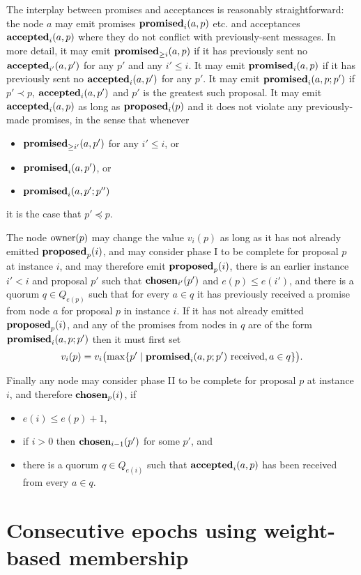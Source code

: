 \documentclass[journal]{IEEEtran}
\begin{document}
The interplay between promises and acceptances is reasonably straightforward:
the node $a$ may emit promises $\mathbf{promised}_{i}(a,p)$ etc. and acceptances
$\mathbf{accepted}_{i}(a,p)$ where they do not conflict with previously-sent messages. In
more detail, it may emit $\mathbf{promised}_{\ge i}(a,p)$ if it has previously sent no
$\mathbf{accepted}_{i'}(a,p')$ for any $p'$ and any $i' \le i$.  It may emit
$\mathbf{promised}_{i}(a,p)$ if it has previously sent no $\mathbf{accepted}_{i}(a,p')$ for any $p'$.
It may emit $\mathbf{promised}_{i}(a,p;p')$ if $p' \prec p$, $\mathbf{accepted}_{i}(a,p')$ and $p'$ is
the greatest such proposal. It may emit $\mathbf{accepted}_{i}(a,p)$ as long as
$\mathbf{proposed}_{i}(p)$ and it does not violate any previously-made promises, in the
sense that whenever \begin{itemize} \item $\mathbf{promised}_{\ge i'}(a,p')$ for any $i' \le
i$, or \item $\mathbf{promised}_{i}(a,p')$, or \item $\mathbf{promised}_{i}(a,p';p'')$\end{itemize}
it is the case that $p' \preceq p$.

The node $\mathrm{owner}(p)$ may change the value $v_i(p)$ as long as it has not
already emitted $\mathbf{proposed}_{p}(i)$, and may consider phase I to be complete for
proposal $p$ at instance $i$, and may therefore emit $\mathbf{proposed}_{p}(i)$, there is an
earlier instance ${i' < i}$ and proposal $p'$ such that $\mathbf{chosen}_{i'}(p')$ and
$e(p) \le e(i')$, and there is a quorum $q \in Q_{e(p)}$ such that for every $a
\in q$ it has previously received a promise from node $a$ for proposal $p$ in
instance $i$. If it has not already emitted $\mathbf{proposed}_{p}(i)$, and any of the
promises from nodes in $q$ are of the form $\mathbf{promised}_{i}(a,p;p')$ then it must
first set \[v_i(p) = v_i\bigl(\mathrm{max} \{p' \mid \mathbf{promised}_{i}(a,p;p')
\textrm{ received}, a \in q \}\bigr).\]

Finally any node may consider phase II to be complete for proposal $p$ at instance
$i$, and therefore $\mathbf{chosen}_{p}(i)$, if
\begin{itemize}
\item $e(i) \le e(p) + 1$,
\item if $i > 0$ then $\mathbf{chosen}_{i-1}(p')$ for some $p'$, and
\item there is a quorum $q \in
Q_{e(i)}$ such that $\mathbf{accepted}_{i}(a,p)$ has been received from every $a \in q$.
\end{itemize}


\section{Consecutive epochs using weight-based membership}
\end{document}
